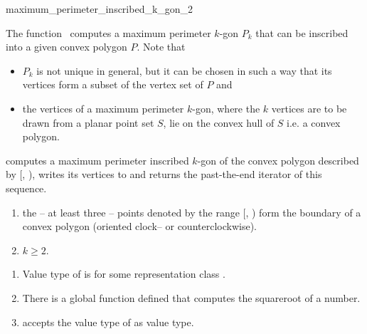 \begin{ccRefFunction}{maximum_perimeter_inscribed_k_gon_2}
  
  \ccDefinition The function \ccRefName\ computes a maximum perimeter
  $k$-gon $P_k$ that can be inscribed into a given convex polygon $P$.
  Note that
  \begin{itemize}
  \item $P_k$ is not unique in general, but it can be chosen in such a
    way that its vertices form a subset of the vertex set of $P$ and
  \item the vertices of a maximum perimeter $k$-gon, where the $k$
    vertices are to be drawn from a planar point set $S$, lie on the
    convex hull of $S$ i.e. a convex polygon.
  \end{itemize}


  \def\ccLongParamLayout{\ccTrue}
  
  computes a maximum perimeter inscribed $k$-gon of the convex polygon
  described by [, ), writes its
  vertices to  and returns the past-the-end iterator of this
  sequence.

  \ccPrecond
  \begin{enumerate}
  \item the -- at least three -- points denoted by the range
    [, ) form the boundary of a
    convex polygon (oriented clock-- or counterclockwise).
  \item $k \ge 2$.
  \end{enumerate}

  \ccRequire
  \begin{enumerate}
  \item Value type of  is 
    for some representation class .
  \item There is a global function 
    defined that computes the squareroot of a number.
  \item {} accepts the value type of
     as value type.
  \end{enumerate}


\end{ccRefFunction}
